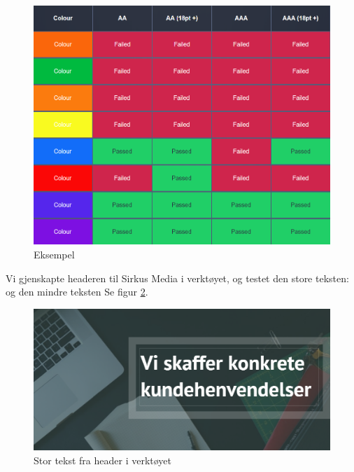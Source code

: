 \begin{figure}[H]
    \centering
    \includegraphics[width=\textwidth]{bjornar/bg-image-eksempel.png}
    \caption{Eksempel}
    \label{fig:analysis-current-a11y_bg-example}
\end{figure}

Vi gjenskapte headeren til Sirkus Media i verktøyet, og testet den store teksten:  og den mindre teksten  Se figur \ref{fig:analysis-current-a11y_bg-generator}. 

\begin{figure}[H]
    \centering
    \includegraphics[width=\textwidth]{bjornar/bg-image-generator.png}
    \caption{Stor tekst fra header i verktøyet}
    \label{fig:analysis-current-a11y_bg-generator}
\end{figure}

